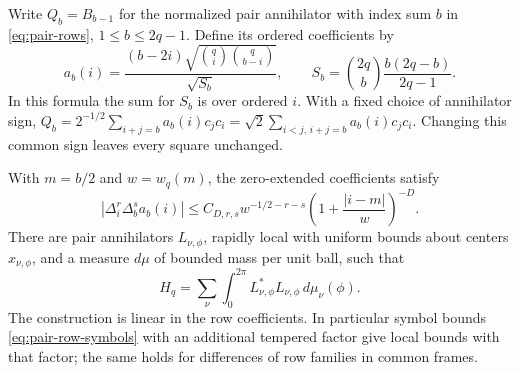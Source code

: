 Write $Q_b=B_{b-1}$ for the normalized pair annihilator with index
sum $b$ in \eqref{eq:pair-rows}, $1\leq b\leq2q-1$.  Define its
ordered coefficients by
\begin{equation}
 a_b(i)=\frac{(b-2i)\sqrt{\binom qi\binom q{b-i}}}{\sqrt{S_b}},
 \qquad
 S_b=\binom{2q}{b}\frac{b(2q-b)}{2q-1}.
 \label{eq:pair-symbol-normalization}
\end{equation}
In this formula the sum for $S_b$ is over ordered $i$.  With a fixed
choice of annihilator sign,
$Q_b=2^{-1/2}\sum_{i+j=b}a_b(i)c_jc_i
=\sqrt2\sum_{i<j,\,i+j=b}a_b(i)c_jc_i$.
Changing this common sign leaves every square unchanged.

\begin{lemma}
\label{locality:row-symbols}
With $m=b/2$ and $w=w_q(m)$, the zero-extended coefficients satisfy
\begin{equation}
 |\Delta_i^r\Delta_b^s a_b(i)|
 \leq C_{D,r,s}w^{-1/2-r-s}
       \left(1+\frac{|i-m|}{w}\right)^{-D}.
 \label{eq:pair-row-symbols}
\end{equation}
There are pair annihilators $L_{\nu,\phi}$, rapidly local with uniform
bounds about centers $x_{\nu,\phi}$, and a measure $d\mu$ of bounded
mass per unit ball, such that
\begin{equation}
 H_q=\sum_\nu\int_0^{2\pi}
                L_{\nu,\phi}^*L_{\nu,\phi}\,d\mu_\nu(\phi).
 \label{eq:pair-local-resolution}
\end{equation}
The construction is linear in the row coefficients.  In particular
symbol bounds \eqref{eq:pair-row-symbols} with an additional tempered
factor give local bounds with that factor; the same holds for
differences of row families in common frames.
\end{lemma}

